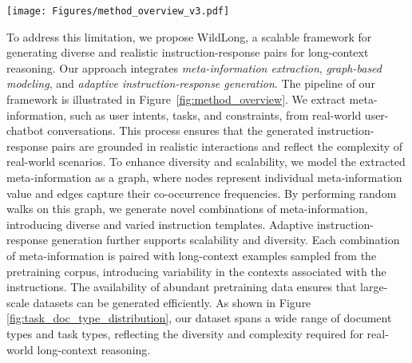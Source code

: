\begin{figure*}[t]
    \centering
    \texttt{[image: Figures/method\_overview\_v3.pdf]}
    \caption{Overview of the two-stage WildLong Framework. Stage 1 extracts meta-information from real-world user-chatbot conversations, classifies documents by type, constructs graphs to represent meta-information relationships, and samples paths to generate tailored instructions. Stage 2 pairs long documents from the pre-training corpus with these instructions, generating instruction-response pairs by rewriting the instructions and answering based on the document context.}
    \label{fig:method_overview}
\end{figure*}

To address this limitation, we propose WildLong, a scalable framework for generating diverse and realistic instruction-response pairs for long-context reasoning. Our approach integrates \textit{meta-information extraction}, \textit{graph-based modeling}, and \textit{adaptive instruction-response generation}. The pipeline of our framework is illustrated in Figure~\ref{fig:method_overview}.
We extract meta-information, such as user intents, tasks, and constraints, from real-world user-chatbot conversations. This process ensures that the generated instruction-response pairs are grounded in realistic interactions and reflect the complexity of real-world scenarios.
To enhance diversity and scalability, we model the extracted meta-information as a graph, where nodes represent individual meta-information value and edges capture their co-occurrence frequencies. By performing random walks on this graph, we generate novel combinations of meta-information, introducing diverse and varied instruction templates. 
Adaptive instruction-response generation further supports scalability and diversity. Each combination of meta-information is paired with long-context examples sampled from the pretraining corpus, introducing variability in the contexts associated with the instructions. The availability of abundant pretraining data ensures that large-scale datasets can be generated efficiently.
As shown in Figure \ref{fig:task_doc_type_distribution}, our dataset spans a wide range of document types and task types, reflecting the diversity and complexity required for real-world long-context reasoning.


